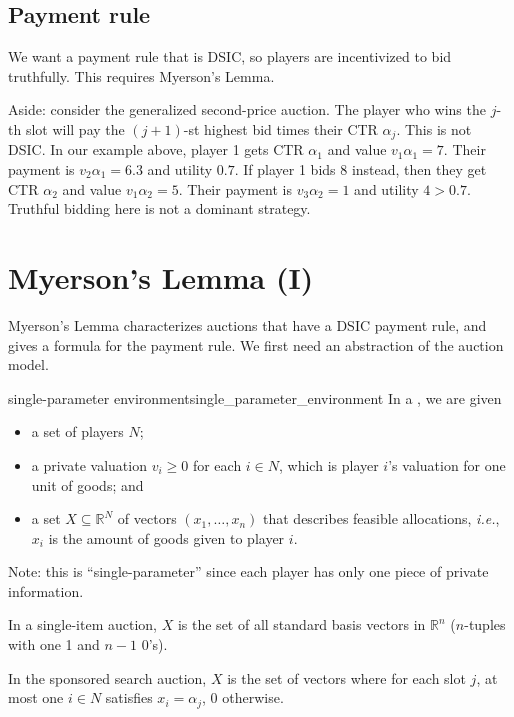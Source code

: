\documentclass[12pt,letterpaper]{report}
\begin{document}
\subsection{Payment rule}

We want a payment rule that is DSIC, so players are incentivized to bid truthfully.
This requires Myerson's Lemma.

Aside: consider the generalized second-price auction.
The player who wins the $j$-th slot will pay the $(j + 1)$-st highest bid times their CTR
$\alpha_j$.
This is not DSIC.
In our example above, player 1 gets CTR $\alpha_1$ and value $v_1 \alpha_1 = 7$.
Their payment is $v_2 \alpha_1 = 6.3$ and utility $0.7$.
If player 1 bids 8 instead, then they get CTR $\alpha_2$ and value $v_1 \alpha_2 = 5$.
Their payment is $v_3 \alpha_2 = 1$ and utility $4 > 0.7$.
Truthful bidding here is not a dominant strategy.

\section{Myerson's Lemma (I)}

Myerson's Lemma characterizes auctions that have a DSIC payment rule, and gives a formula for the
payment rule.
We first need an abstraction of the auction model.

\begin{defn}{single-parameter environment}{single_parameter_environment}
  In a , we are given
  \begin{itemize}
    \item a set of players $N$;
    \item a private valuation $v_i \geq 0$ for each $i \in N$, which is player $i$'s valuation for
      one unit of goods; and
    \item a set $X \subseteq \mathbb{R}^N$ of vectors $(x_1, \ldots, x_n)$ that describes feasible
      allocations, \emph{i.e.}, $x_i$ is the amount of goods given to player $i$.
  \end{itemize}
\end{defn}

Note: this is ``single-parameter'' since each player has only one piece of private information.

\begin{ex}
  In a single-item auction, $X$ is the set of all standard basis vectors in $\mathbb{R}^n$
  ($n$-tuples with one 1 and $n - 1$ 0's).

  In the sponsored search auction, $X$ is the set of vectors where for each slot $j$, at most one
  $i \in N$ satisfies $x_i = \alpha_j$, 0 otherwise.
\end{ex}
\end{document}
